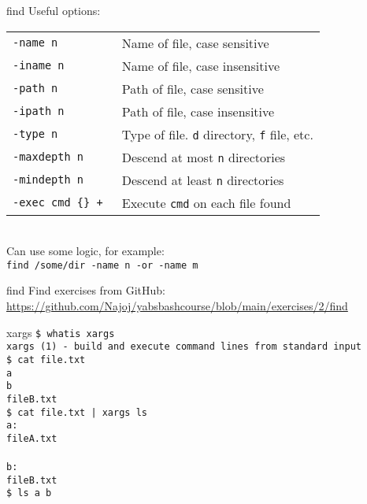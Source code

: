 \documentclass{beamer}
\let\tt\texttt
\begin{document}
\begin{frame}{find}
        Useful options:\\
        \begin{tabular}{| l | l}
                \hline
                \tt{-name n}            &   Name of file, case sensitive \\
                \tt{-iname n}           &   Name of file, case insensitive \\
                \tt{-path n}            &   Path of file, case sensitive \\
                \tt{-ipath n}           &   Path of file, case insensitive \\
                \tt{-type n}            &   Type of file. \tt{d} directory, \tt{f} file, etc. \\
                \tt{-maxdepth n}        &   Descend at most \tt{n} directories \\
                \tt{-mindepth n}        &   Descend at least \tt{n} directories \\
                \tt{-exec cmd \{\} + }  &   Execute \tt{cmd} on each file found \\
                \hline
        \end{tabular} \\
        \medskip
        Can use some logic, for example: \\
        \tt{find /some/dir -name n -or -name m}
\end{frame}

\begin{frame}{find}
        Find exercises from GitHub: \\
        \url{https://github.com/Najoj/yabsbashcourse/blob/main/exercises/2/find}
\end{frame}

\begin{frame}{xargs}
        \tt{\$ whatis xargs}\\
        \tt{xargs (1)  - build and execute command lines from standard input}\\
        \tt{\$ cat file.txt} \\
        \tt{a} \\
        \tt{b} \\
        \tt{fileB.txt} \\
        \tt{\$ cat file.txt | xargs ls} \\
        \tt{a:} \\
        \tt{fileA.txt} \\
        \tt{} \\
        \tt{b:} \\
        \tt{fileB.txt} \\
        \tt{\$ ls a b} \\
\end{frame}
\end{document}
